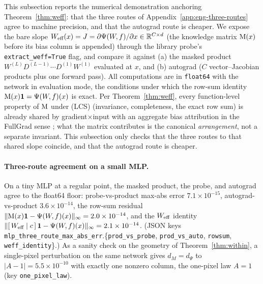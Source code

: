 This subsection reports the numerical demonstration anchoring
Theorem~\ref{thm:weff}: that the three routes of
Appendix~\ref{app:eng-three-routes} agree to machine precision, and that the
autograd route is cheaper. We expose the bare slope
$W_{\text{eff}}(x)=J=\partial\Psi(W\!,f)/\partial x \in \mathbb{R}^{C\times d}$ (the knowledge matrix
$\mathrm{M}(x)$ before its bias column is appended) through the library probe's
\verb|extract_weff=True| flag, and compare it against (a) the masked product
$W^{(L)}D^{(L-1)}\cdots D^{(1)}W^{(1)}$ evaluated at $x$, and (b) autograd
($C$ vector--Jacobian products plus one forward pass). All computations are
in \texttt{float64} with the network in evaluation mode, the conditions under
which the row-sum identity $\mathrm{M}(x)\mathbf{1}=\Psi(W\!,f)(x)$ is exact. Per
Theorem~\ref{thm:weff}, every function-level property of $\mathrm{M}$ under (LCS)
(invariance, completeness, the exact row sum) is already shared by
gradient$\times$input with an aggregate bias attribution in the FullGrad
sense \citep{shrikumar2016not,ancona2018towards,srinivas2019full}; what the
matrix contributes is the canonical \emph{arrangement}, not a separate
invariant. This subsection only checks that the three routes to that shared
slope coincide, and that the autograd route is cheaper.

\paragraph{Three-route agreement on a small MLP.}
On a tiny MLP at a regular point, the masked product, the probe, and autograd
agree to the float64 floor: probe-vs-product max-abs error
$7.1\times10^{-15}$, autograd-vs-product $3.6\times10^{-14}$, the row-sum
residual $\|\mathrm{M}(x)\mathbf{1}-\Psi(W\!,f)(x)\|_\infty = 2.0\times10^{-14}$, and the
$W_{\text{eff}}$ identity $\|[\,W_{\text{eff}}\mid c\,]\,\mathbf{1}-\Psi(W\!,f)(x)\|_\infty
= 2.1\times10^{-14}$.
(JSON keys \texttt{mlp\_three\_route\_max\_abs\_err}.\{\texttt{prod\_vs\_probe},
\texttt{prod\_vs\_auto}, \texttt{rowsum}, \texttt{weff\_identity}\}.) As a
sanity check on the geometry of Theorem~\ref{thm:within}, a single-pixel
perturbation on the same network gives $d_M = d_\Psi$ to
$|A-1| = 5.5\times10^{-10}$ with exactly one nonzero column, the one-pixel
law $A=1$ (key \texttt{one\_pixel\_law}).


